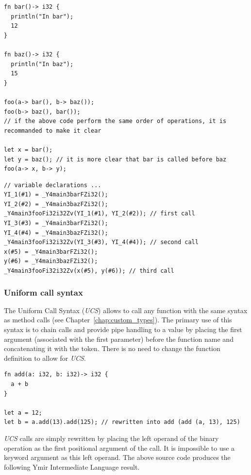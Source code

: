 \begin{lstlisting}[style=coloredverbatim]
fn bar()-> i32 {
  println("In bar");
  12
}

fn baz()-> i32 {
  println("In baz");
  15
}

foo(a-> bar(), b-> baz());
foo(b-> baz(), bar());
// if the above code perform the same order of operations, it is recommanded to make it clear

let x = bar();
let y = baz(); // it is more clear that bar is called before baz
foo(a-> x, b-> y);
\end{lstlisting}
\smallskip

\begin{lstlisting}[style=lyilVerb]
// variable declarations ...
YI_1(#1) = _Y4main3barFZi32();
YI_2(#2) = _Y4main3bazFZi32();
_Y4main3fooFi32i32Zv(YI_1(#1), YI_2(#2)); // first call
YI_3(#3) = _Y4main3barFZi32();
YI_4(#4) = _Y4main3bazFZi32();
_Y4main3fooFi32i32Zv(YI_3(#3), YI_4(#4)); // second call
x(#5) = _Y4main3barFZi32();
y(#6) = _Y4main3bazFZi32();
_Y4main3fooFi32i32Zv(x(#5), y(#6)); // third call
\end{lstlisting}

\subsubsection*{Uniform call syntax}

The Uniform Call Syntax (\textit{UCS}) allows to call any function with the same
syntax as method calls (see Chapter~\ref{chap:custom_types}). The primary use of
this syntax is to chain calls and provide pipe handling to a value by placing
the first argument (associated with the first parameter) before the function
name and concatenating it with the  token. There is no need to change
the function definition to allow for \textit{UCS}.

\begin{lstlisting}[style=coloredverbatim]
fn add(a: i32, b: i32)-> i32 {
  a + b
}

let a = 12;
let b = a.add(13).add(125); // rewritten into add (add (a, 13), 125)
\end{lstlisting}

\textit{UCS} calls are simply rewritten by placing the left operand of the
binary operation  as the first positional argument of the call. It is
impossible to use a keyword argument as this left operand. The above source code
produces the following Ymir Intermediate Language result.
\smallskip

